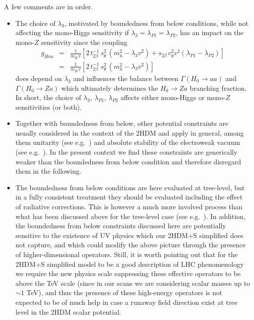     \vspace{3mm}
    
    A few comments are in order. 
    
    \begin{itemize}
     \item The choice of $\lambda_3$, motivated by boundedness from below conditions, while not affecting the mono-Higgs sensitivity 
    if $\lambda_3 = \lambda_{P1} = \lambda_{P2}$, has an impact on the mono-$Z$ sensitivity since the coupling 
    \begin{eqnarray}
     g_{Haa} &=& \frac{1}{m_{H} \,v} \left[ 2\, t_{2\beta}^{-1}\, s_{\theta}^2\, 
(m_h^2 - \lambda_3 v^2) + s_{2\beta}\, c_{\theta}^2 v^2 (\lambda_{P1} - \lambda_{P2}) \right] \nonumber \\
      &=& \frac{1}{m_{H} \,v} \left[ 2\, t_{2\beta}^{-1}\, s_{\theta}^2\, 
(m_h^2 - \lambda_3 v^2) \right] 
    \end{eqnarray}
    does depend on $\lambda_3$ and influences the balance between $\Gamma(H_0 \to aa)$ and $\Gamma(H_0 \to Za)$ which ultimately determines the 
    $H_0 \to Za$ branching fraction. In short, the choice of $\lambda_3$, $\lambda_{P1}$, $\lambda_{P2}$ affects either mono-Higgs or mono-$Z$ sensitivities
    (or both).
    
    \item Together with boundedness from below, other potential constraints are usually considered in the context of the 2HDM and apply in general, 
    among them unitarity (see e.g.~\cite{Ginzburg:2005dt,Grinstein:2015rtl}) and absolute stability of the electroweak vacuum (see e.g.~\cite{Barroso:2013awa}). 
    In the present context we find these constraints 
    are generically weaker than the boundedness from below condition and therefore disregard them in the following. 
    
    \item The boundedness from below conditions are here evaluated at tree-level, but in a fully consistent treatment 
    they should be evaluated including the effect of radiative corrections. This is however 
    a much more involved process than what has been discussed above for the 
    tree-level case (see e.g.~\cite{Staub:2017ktc}). In addition, 
    the boundedness from below constraints discussed here are potentially sensitive to the 
    existence of UV physics which our 2HDM+S simplified does not capture, and which could modify the above picture through the presence of higher-dimensional 
    operators. Still, it is worth pointing out that for the 2HDM+S simplified model to be a good description of LHC phenomenology we require 
    the new physics scale suppressing these effective operators to be above the TeV scale (since in our scans we are considering scalar masses up to $\sim 1$ TeV), 
    and thus the presence of these high-energy operators is not expected to be of much help in case a runaway field direction exist at tree level in the 2HDM scalar 
    potential.
    \end{itemize}
    

